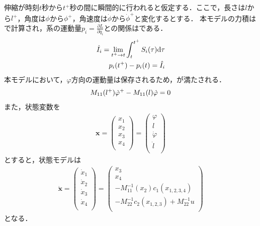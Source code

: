           伸縮が時刻$t$秒から$t^{+}$秒の間に瞬間的に行われると仮定する．ここで，長さは$l$から$l^{+}$，角度は$\phi$から$\phi^{+}$，角速度は$\dot{\phi}$から$\dot{\phi}^{+}$と変化するとする．
          本モデルの力積はで計算され，系の運動量$p_i = \frac{\partial L}{\partial \dot{q}_i}$との関係はである．
          \begin{eqnarray}
            \equlabel{Si}
            \hat{I}_i = \lim_{t^{+}\to t} \int_{t}^{t^{+}} S_i (\tau) \mathrm{d}\tau\\
            \equlabel{pi}
            p_i(t^{+})-p_i(t)=\hat{I}_i
            \end{eqnarray}
          本モデルにおいて，$\varphi$方向の運動量は保存されるため，が満たされる．
          \begin{eqnarray}
            \equlabel{impulse}
            M_{11}(l^{+})\dot{\varphi}^{+}-M_{11}(l)\dot{\varphi}=0
            \end{eqnarray}
          また，状態変数を
          \begin{eqnarray}
            \bm{x}=
            \begin{pmatrix}
              x_1\\
              x_2\\
              x_3\\
              x_4\\
              \end{pmatrix}
              =
              \begin{pmatrix}
                \varphi\\
                l\\
                \dot{\varphi}\\
                \dot{l}\\
                \end{pmatrix}
            \end{eqnarray}
          とすると，状態モデルは
          \begin{eqnarray}
            \dot{\bm{x}}=
            \begin{pmatrix}
              \dot{x}_1\\
              \dot{x}_2\\
              \dot{x}_3\\
              \dot{x}_4\\
              \end{pmatrix}
              =
              \begin{pmatrix}
                x_3\\
                x_4\\
                -M_{11}^{-1}(x_2)c_1(x_{1,2,3,4})\\
                -M_{22}^{-1}c_2(x_{1,2,3})+M_{22}^{-1}u\\
                \end{pmatrix}
            \end{eqnarray}
          となる．

